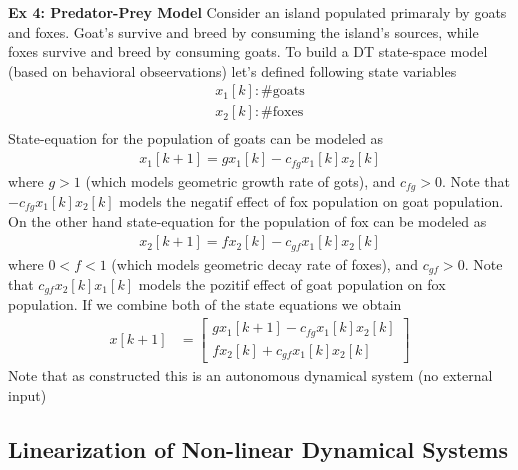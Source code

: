 \documentclass[twoside]{article}
\begin{document}
\newpage

\textbf{Ex 4: Predator-Prey Model}
%
Consider an island populated primaraly by goats and foxes. Goat's
survive and breed by consuming the island's sources, while foxes
survive and breed by consuming goats. To build a DT state-space model
(based on behavioral obseervations) let's defined following state
variables
%
  \begin{align*}
    x_1[k] : \# \mathrm{goats} \\
    x_2[k] : \# \mathrm{foxes} \\
  \end{align*}
%
State-equation for the population of goats can be modeled as
%
  \begin{align*}
    x_1[k+1] = g x_1[k] - c_{fg} x_1[k] x_2[k] 
  \end{align*}
%
where $g > 1$ (which models geometric growth rate of gots), and
$c_{fg} > 0$. Note that $- c_{fg} x_1[k] x_2[k] $ models the negatif
effect of fox population on goat population. On the other hand 
state-equation for the population of fox can be modeled as
%
  \begin{align*}
    x_2[k+1] = f x_2[k] - c_{gf} x_1[k] x_2[k] 
  \end{align*}
%
where $0 < f < 1$ (which models geometric decay rate of foxes), and
$c_{gf} > 0$. Note that $c_{gf} x_2[k] x_1[k] $ models the pozitif
effect of goat population on fox population. If we combine both of the 
state equations we obtain
%
\begin{align*}
	x[k+1] &= \left[ \begin{array}{c} g x_1[k+1] - c_{fg} x_1[k] x_2[k]   \\ 
                          f x_2[k] + c_{gf} x_1[k] x_2[k]  \end{array} \right] 
\end{align*}
%
Note that as constructed this is an autonomous dynamical system (no
external input)

\subsection{Linearization of Non-linear Dynamical Systems}
\end{document}
